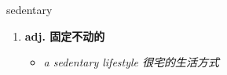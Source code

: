 
\begin{frame}
{\huge sedentary}
\begin{center}
\begin{enumerate}\Large
  \item \textbf{adj. 固定不动的}
  \begin{itemize}
    \item \em{\Large{a sedentary lifestyle 很宅的生活方式}}
  \end{itemize}
\end{enumerate}
\end{center}
\end{frame}
